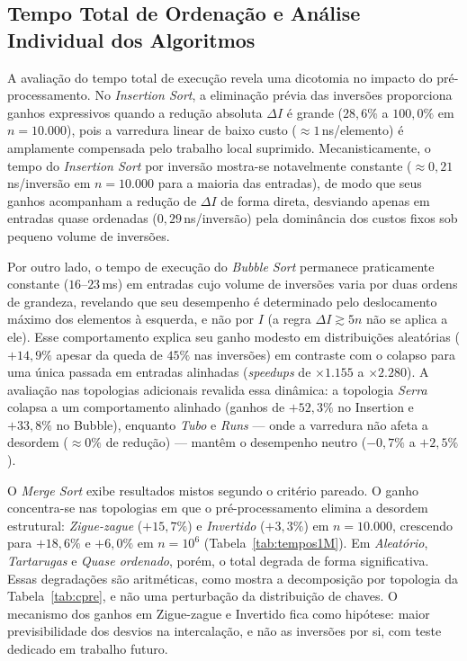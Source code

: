 \documentclass[portuguese]{sbc2025}%
\begin{document}
\subsection{Tempo Total de Ordenação e Análise Individual dos Algoritmos}

A avaliação do tempo total de execução revela uma dicotomia no impacto do pré-processamento. No \emph{Insertion Sort}, a eliminação prévia das inversões proporciona ganhos expressivos quando a redução absoluta $\Delta I$ é grande ($28{,}6\%$ a $100{,}0\%$ em $n{=}10.000$), pois a varredura linear de baixo custo ($\approx 1$\,ns/elemento) é amplamente compensada pelo trabalho local suprimido. Mecanisticamente, o tempo do \emph{Insertion Sort} por inversão mostra-se notavelmente constante ($\approx 0{,}21$\,ns/inversão em $n{=}10.000$ para a maioria das entradas), de modo que seus ganhos acompanham a redução de $\Delta I$ de forma direta, desviando apenas em entradas quase ordenadas ($0{,}29$\,ns/inversão) pela dominância dos custos fixos sob pequeno volume de inversões.

Por outro lado, o tempo de execução do \emph{Bubble Sort} permanece praticamente constante ($16$--$23$\,ms) em entradas cujo volume de inversões varia por duas ordens de grandeza, revelando que seu desempenho é determinado pelo deslocamento máximo dos elementos à esquerda, e não por $I$ (a regra $\Delta I \gtrsim 5n$ não se aplica a ele). Esse comportamento explica seu ganho modesto em distribuições aleatórias ($+14{,}9\%$ apesar da queda de $45\%$ nas inversões) em contraste com o colapso para uma única passada em entradas alinhadas (\emph{speedups} de $\times 1.155$ a $\times 2.280$). A avaliação nas topologias adicionais revalida essa dinâmica: a topologia \emph{Serra} colapsa a um comportamento alinhado (ganhos de $+52{,}3\%$ no Insertion e $+33{,}8\%$ no Bubble), enquanto \emph{Tubo} e \emph{Runs} — onde a varredura não afeta a desordem ($\approx 0\%$ de redução) — mantêm o desempenho neutro ($-0{,}7\%$ a $+2{,}5\%$).

O \emph{Merge Sort} exibe resultados mistos segundo o critério pareado. O ganho concentra-se nas topologias em que o pré-processamento elimina a desordem estrutural: \emph{Zigue-zague} ($+15{,}7\%$) e \emph{Invertido} ($+3{,}3\%$) em $n{=}10.000$, crescendo para $+18{,}6\%$ e $+6{,}0\%$ em $n{=}10^6$ (Tabela~\ref{tab:tempos1M}). Em \emph{Aleatório}, \emph{Tartarugas} e \emph{Quase ordenado}, porém, o total degrada de forma significativa. Essas degradações são aritméticas, como mostra a decomposição por topologia da Tabela~\ref{tab:cpre}, e não uma perturbação da distribuição de chaves. O mecanismo dos ganhos em Zigue-zague e Invertido fica como hipótese: maior previsibilidade dos desvios na intercalação, e não as inversões por si, com teste dedicado em trabalho futuro.
\end{document}
